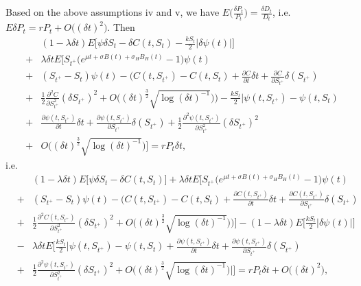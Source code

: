 \documentclass[a4paper,11pt]{amsart}
\numberwithin{equation}{section}
\theoremstyle{definition}
\theoremstyle{plain}
\theoremstyle{definition}
\newcommand{\1}{\mathbf{1}}
\begin{document}
Based on the above assumptions iv and v, we have $E\Big(\frac{\delta P_t}{P_t}\Big)=\frac{\delta D_t}{D_t}$, i.e. $E\delta P_t=rP_t+O\big((\delta t)^2\big)$. Then
\begin{eqnarray}
&&(1-\lambda\delta t)E\Big[\psi\delta S_t-\delta C(t,S_t)-\frac{kS_t}{2}|\delta \psi(t)|\Big]\nonumber\\
&+&\lambda\delta tE\Big[S_{t^+}\big(e^{\mu t+\sigma B(t)+\sigma_HB_H(t)}-1\big)\psi(t)\nonumber\\
&+&(S_{t^+}-S_t)\psi(t)-\Big(C(t,S_{t^+})-C(t,S_t)+\frac{\partial C}{\partial t}\delta t+\frac{\partial C}{\partial S_{t^+}}\delta (S_{t^+})\nonumber\\
&+&\frac{1}{2}\frac{\partial^2C}{\partial S_{t^+}^2}(\delta S_{t^+})^2+O\big((\delta t)^{\frac{3}{2}}\sqrt{\log (\delta t)^{-1}}\big)\Big)-\frac{kS_t}{2}\Big|\psi(t,S_{t^+})-\psi(t,S_t)\nonumber\\
&+&\frac{\partial \psi(t,S_{t^+})}{\partial t}\delta t+\frac{\partial \psi(t,S_{t^+})}{\partial S_{t^+}}\delta (S_{t^+})
+\frac{1}{2}\frac{\partial^2\psi(t,S_{t^+})}{\partial S_{t^+}^2}(\delta S_{t^+})^2\nonumber\\
&+&O\big((\delta t)^{\frac{3}{2}}\sqrt{\log (\delta t)^{-1}}\big)\Big]=rP_t\delta t\nonumber,
\label{eq:a18}
\end{eqnarray}
i.e.
\begin{eqnarray}
&&(1-\lambda\delta t)E\Big[\psi\delta S_t-\delta C(t,S_t)\Big]+\lambda\delta tE\Big[S_{t^+}\big(e^{\mu t+\sigma B(t)+\sigma_HB_H(t)}-1\big)\psi(t)\nonumber\\
&+&(S_{t^+}-S_t)\psi(t)-\Big(C(t,S_{t^+})-C(t,S_t)+\frac{\partial C(t,S_{t^+})}{\partial t}\delta t+\frac{\partial C(t,S_{t^+})}{\partial S_{t^+}}\delta (S_{t^+})\nonumber\\
&+&\frac{1}{2}\frac{\partial^2C(t,S_{t^+})}{\partial S_{t^+}^2}(\delta S_{t^+})^2+O\big((\delta t)^{\frac{3}{2}}\sqrt{\log (\delta t)^{-1}}\big)\Big)\Big]-(1-\lambda\delta t)E\Big[\frac{kS_t}{2}|\delta \psi(t)|\Big]\nonumber\\
&-&\lambda\delta tE\Big[\frac{kS_t}{2}\Big|\psi(t,S_{t^+})-\psi(t,S_t)+\frac{\partial \psi(t,S_{t^+})}{\partial t}\delta t+\frac{\partial \psi(t,S_{t^+})}{\partial S_{t^+}}\delta (S_{t^+})\nonumber\\
&+&\frac{1}{2}\frac{\partial^2\psi(t,S_{t^+})}{\partial S_{t^+}^2}(\delta S_{t^+})^2+O\big((\delta t)^{\frac{3}{2}}\sqrt{\log (\delta t)^{-1}}\big)\Big|\Big]
=rP_t\delta t+O\big((\delta t)^2\big)\nonumber,
\label{eq:a18}
\end{eqnarray}
\end{document}
